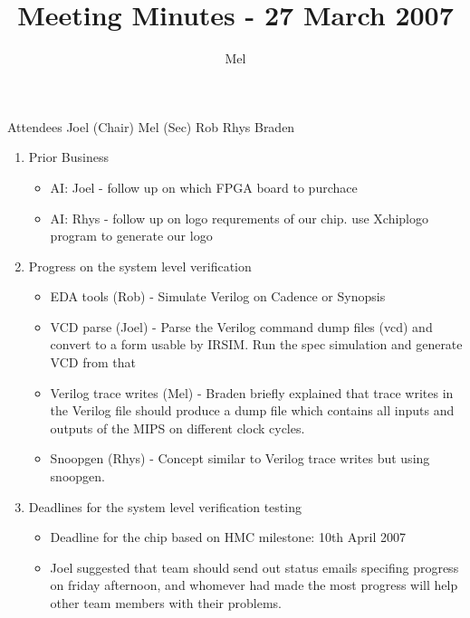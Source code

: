 \documentclass{article}
\begin{document}
\author{Mel}
\title{Meeting Minutes - 27 March 2007}
\maketitle
\begin{flushleft}

Attendees
Joel (Chair)
Mel (Sec)
Rob
Rhys
Braden
\newline

\begin{enumerate}
  \item Prior Business
    \begin{itemize}
    \item AI: Joel - follow up on which FPGA board to purchace
    \item AI: Rhys - follow up on logo requrements of our chip.
                     use Xchiplogo program to generate our logo
    \end{itemize}

  \item Progress on the system level verification
    \begin{itemize}
    \item EDA tools (Rob) - Simulate Verilog on Cadence or Synopsis
    \item VCD parse (Joel) - Parse the Verilog command dump files (vcd) and
          convert to a form usable by IRSIM. Run the spec simulation and 
          generate VCD from that
    \item Verilog trace writes (Mel) - Braden briefly explained that trace
          writes in the Verilog file should produce a dump file which
          contains all inputs and outputs of the MIPS on different clock cycles.
    \item Snoopgen (Rhys) - Concept similar to Verilog trace writes but
          using snoopgen.
    \end{itemize}

  \item  Deadlines for the system level verification testing
    \begin{itemize}
    \item Deadline for the chip based on HMC milestone: 10th April 2007
    \item Joel suggested that team should send out status emails
          specifing progress on friday afternoon, and whomever
          had made the most progress will help other team members
          with their problems.
    \end{itemize}


\end{enumerate}
\end{flushleft}
\end{document}
